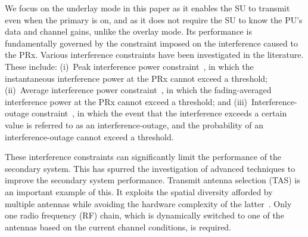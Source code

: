 \documentclass[12pt,draftcls,peerreview,onecolumn]{IEEEtran}
\begin{document}
We focus on the underlay mode in this paper as it enables the SU to transmit even when the primary is on, and as it does not require the SU to know the PU's data and channel gains, unlike the overlay mode. Its performance is fundamentally governed by the constraint imposed on the interference caused to the PRx. Various interference constraints have been investigated in the literature. These include: (i)~Peak interference power constraint~\cite{ Hanif_2015_globecom,Wang_2010_TWC, RZhang_2009_TWC}, in which  the instantaneous interference power at the PRx cannot exceed  a threshold; (ii)~Average interference power  constraint~\cite{ Sarvendranath_2013_TCOM,Wang_2011_TCom, Kashyap_2014_TCOM }, in which  the fading-averaged interference power at the PRx  cannot exceed  a threshold;  and (iii)~Interference-outage constraint~\cite{Kashyap_2014_TCOM,Sboui_2013_TWC,Rezki_2012_ieeeVt}, in which the event that the interference exceeds a certain value is referred to as an interference-outage, and the probability of an interference-outage cannot exceed a threshold.  

These interference constraints can significantly limit the performance of the secondary system. This has spurred the investigation of advanced techniques to improve the secondary system performance. Transmit antenna selection (TAS) is an important example of this. It exploits the spatial diversity afforded by multiple antennas while avoiding the hardware complexity of the latter~\cite{mehta_2012_ComMag}. Only one radio frequency (RF) chain, which is dynamically switched to one of the antennas based on the current channel conditions, is required. 
\end{document}
